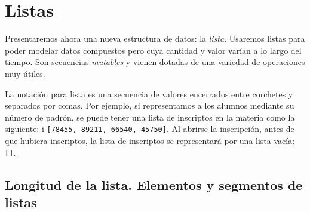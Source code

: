 


\section{Listas}

Presentaremos ahora una nueva estructura de datos: la {\it lista}.
Usaremos listas para poder modelar datos compuestos pero cuya cantidad y
valor varían a lo largo del tiempo. Son secuencias {\it mutables} y vienen
dotadas de una variedad de operaciones muy útiles.

La notación para lista es una secuencia de valores encerrados entre
corchetes y separados por comas.  Por ejemplo, si representamos a los
alumnos mediante su número de padrón, se puede tener una lista de
inscriptos en la materia como la siguiente: i
\lstinline![78455, 89211, 66540, 45750]!.
Al abrirse la inscripción, antes de que hubiera inscriptos, la lista de
inscriptos se representará por una lista vacía: \lstinline![]!.

\subsection{Longitud de la lista. Elementos y segmentos de listas}


